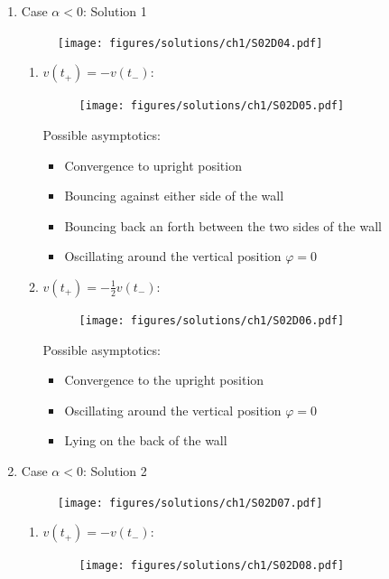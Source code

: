 \begin{solution}[1.1]
\begin{enumerate}
\begin{enumerate}
\end{enumerate}
\newpage
\item Case $\alpha < 0$: Solution 1
\begin{figure}[h]
	\centering
	\texttt{[image: figures/solutions/ch1/S02D04.pdf]}
\end{figure}

\begin{enumerate}
	\item $ v(t_+) = -v(t_-) $:

\begin{figure}[h]
	\centering
	\texttt{[image: figures/solutions/ch1/S02D05.pdf]}
\end{figure}
Possible asymptotics:
\begin{itemize}
	\item Convergence to upright position
	\item Bouncing against either side of the wall
	\item Bouncing back an forth between the two sides of the wall
	\item Oscillating around the vertical position $\varphi = 0$
\end{itemize}


\item $ v(t_+) = -\frac{1}{2}v(t_-) $:
\begin{figure}[h]
	\centering
	\texttt{[image: figures/solutions/ch1/S02D06.pdf]}
\end{figure}
Possible asymptotics:
\begin{itemize}
	\item Convergence to the upright position
	\item Oscillating around the vertical position $\varphi = 0$
	\item Lying on the back of the wall
\end{itemize}
\end{enumerate}
\newpage
\item Case $\alpha < 0$: Solution 2
\begin{figure}[h]
	\centering
	\texttt{[image: figures/solutions/ch1/S02D07.pdf]}
\end{figure}

\begin{enumerate}
\item $ v(t_+) = -v(t_-) $:

\begin{figure}[h]
	\centering
	\texttt{[image: figures/solutions/ch1/S02D08.pdf]}
\end{figure}


\end{enumerate}
\end{enumerate}
\end{solution}

